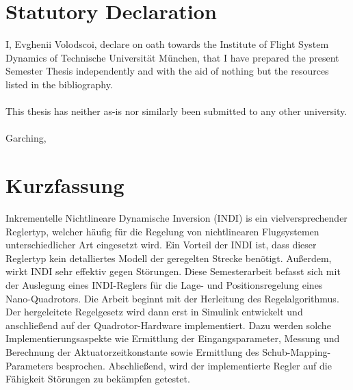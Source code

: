 \documentclass[11pt, a4paper, twoside]{report}
\begin{document}



\newpage\null\thispagestyle{empty}\newpage


\vspace*{-0.8cm}
\section*{Statutory Declaration}
I, Evghenii Volodscoi, declare on oath towards the Institute of Flight System Dynamics of Technische Universität München, that I have prepared the present Semester Thesis independently and with the aid of nothing but the resources listed in the bibliography.
\\
\\
This thesis has neither as-is nor similarly been submitted to any other university.
\bigskip
\\
\\
Garching, 

\thispagestyle{fancy_beginning}
\renewcommand{\chaptermark}[1]{\markboth{#1}{}}
\chaptermark{Statutory Declaration}

\newpage\null\thispagestyle{empty}\newpage

\section*{Kurzfassung} \label{sec:kurzfassung}
\begin{itshape}
Inkrementelle Nichtlineare Dynamische Inversion (INDI) is ein vielversprechender Reglertyp, welcher h\"aufig f\"ur die Regelung von nichtlinearen Flugsystemen unterschiedlicher Art eingesetzt wird. Ein Vorteil der INDI ist, dass dieser Reglertyp kein detalliertes Modell der geregelten Strecke ben\"otigt. Au\ss{}erdem, wirkt INDI sehr effektiv gegen St\"orungen. Diese Semesterarbeit befasst sich mit der Auslegung eines INDI-Reglers f\"ur die Lage- und Positionsregelung eines Nano-Quadrotors. Die Arbeit beginnt mit der Herleitung des Regelalgorithmus. Der hergeleitete Regelgesetz wird dann erst in Simulink entwickelt und anschlie\ss{}end auf der Quadrotor-Hardware implementiert. Dazu werden solche Implementierungsaspekte wie Ermittlung der Eingangsparameter, Messung und Berechnung der Aktuatorzeitkonstante sowie Ermittlung des Schub-Mapping-Parameters besprochen. Abschlie\ss{}end, wird der implementierte Regler auf die F\"ahigkeit St\"orungen zu bek\"ampfen getestet.
\end{itshape}
\end{document}
